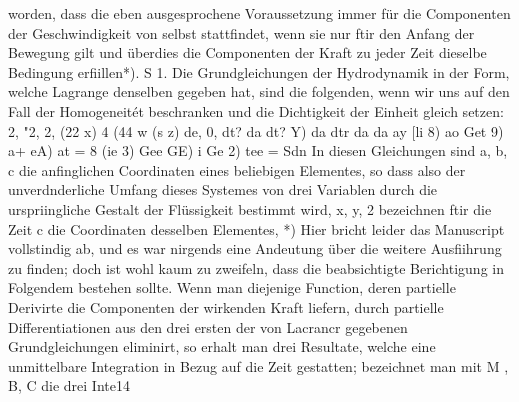 \documentclass[11pt]{article}
\begin{document}
worden, dass die eben ausgesprochene Voraussetzung immer für die Componenten der
Geschwindigkeit von selbst stattfindet, wenn sie nur ftir den Anfang der Bewegung gilt
und überdies die Componenten der Kraft zu jeder Zeit dieselbe Bedingung erfiillen*).
S 1. Die Grundgleichungen der Hydrodynamik in der Form, welche Lagrange denselben
gegeben hat, sind die folgenden, wenn wir uns auf den Fall der Homogeneitét beschranken
und die Dichtigkeit der Einheit gleich setzen: 2, "2, 2, (22 x) 4 (44 w (s z) de, 0, dt? da
dt? Y) da dtr da da ay [li 8) ao Get 9) a+ eA) at = 8 (ie 3) Gee GE) i Ge 2) tee = Sdn
In diesen Gleichungen sind a, b, c die anfinglichen Coordinaten eines beliebigen Elementes, so dass also der unverdnderliche Umfang dieses Systemes von drei Variablen durch
die urspriingliche Gestalt der Flüssigkeit bestimmt wird, x, y, 2 bezeichnen ftir die Zeit
c die Coordinaten desselben Elementes, *) Hier bricht leider das Manuscript vollstindig
ab, und es war nirgends eine Andeutung über die weitere Ausfiihrung zu finden; doch ist
wohl kaum zu zweifeln, dass die beabsichtigte Berichtigung in Folgendem bestehen sollte.
Wenn man diejenige Function, deren partielle Derivirte die Componenten der wirkenden
Kraft liefern, durch partielle Differentiationen aus den drei ersten der von Lacrancr gegebenen Grundgleichungen eliminirt, so erhalt man drei Resultate, welche eine unmittelbare
Integration in Bezug auf die Zeit gestatten; bezeichnet man mit M , B, C die drei Inte14
\end{document}
